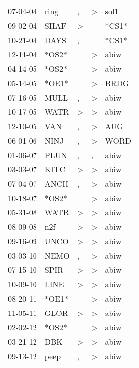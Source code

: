 \begin{supertabular}{lllll}
 07-04-04 &   ring &             , &     \textgreater &   sol1 \\
 09-02-04 &   SHAF &  \textgreater &                  &  *CS1* \\
 10-21-04 &   DAYS &             , &                  &  *CS1* \\
 12-11-04 &  *OS2* &               &     \textgreater &   abiw \\
 04-14-05 &  *OS2* &               &     \textgreater &   abiw \\
 05-14-05 &  *OE1* &               &     \textgreater &   BRDG \\
 07-16-05 &   MULL &             , &     \textgreater &   abiw \\
 10-17-05 &   WATR &  \textgreater &     \textgreater &   abiw \\
 12-10-05 &    VAN &             , &     \textgreater &    AUG \\
 06-01-06 &   NINJ &             , &     \textgreater &   WORD \\
 01-06-07 &   PLUN &             , &                , &   abiw \\
 03-03-07 &   KITC &  \textgreater &     \textgreater &   abiw \\
 07-04-07 &   ANCH &             , &     \textgreater &   abiw \\
 10-18-07 &  *OS2* &               &     \textgreater &   abiw \\
 05-31-08 &   WATR &  \textgreater &     \textgreater &   abiw \\
 08-09-08 &    n2f &  \textgreater &     \textgreater &   abiw \\
 09-16-09 &   UNCO &  \textgreater &     \textgreater &   abiw \\
 03-03-10 &   NEMO &             , &     \textgreater &   abiw \\
 07-15-10 &   SPIR &  \textgreater &     \textgreater &   abiw \\
 10-09-10 &   LINE &  \textgreater &     \textgreater &   abiw \\
 08-20-11 &  *OE1* &               &     \textgreater &   abiw \\
 11-05-11 &   GLOR &  \textgreater &     \textgreater &   abiw \\
 02-02-12 &  *OS2* &               &     \textgreater &   abiw \\
 03-21-12 &    DBK &  \textgreater &     \textgreater &   abiw \\
 09-13-12 &   peep &             , &     \textgreater &   abiw \\

\end{supertabular}
